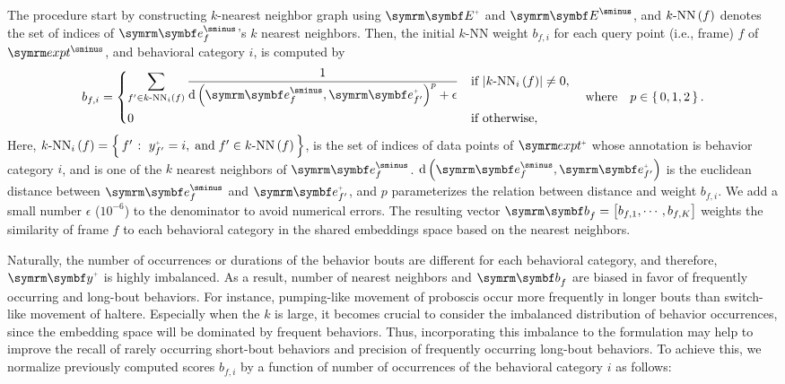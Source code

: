 The procedure start by constructing $k$-nearest neighbor graph using $\Ann{\V{E}}$ and $\Unann{\V{E}}$, and ${k\mathrm{\textnormal{-}NN}} \left( f \right)$ denotes the set of indices of $\Unann{\V{e}}_f$'s $k$ nearest neighbors. Then, the initial $k$-NN weight $b_{f,i}$ for each query point (i.e., frame) $f$ of $\exptUnann$, and behavioral category $i$, is computed by
\begin{equation}
	b_{f,i} = \begin{dcases}
		\sum_{f^\prime \in \NNi{k}{i}{f}}\frac{1}{\dist{\Unann{\V{e}}_f}{\Ann{\V{e}}_{f^\prime}}^p + \epsilon} & \textnormal{if } \card{\NNi{k}{i}{f}} \neq 0, \\
		0                                                                                                      & \textnormal{if otherwise},
	\end{dcases} \qbwhere p \in \set{0,1,2}.
\end{equation}
Here, $\NNi{k}{i}{f}=\Set{f^\prime}{\Ann{y}_{f^\prime}=i, \dband f^\prime \in \NN{k}{f}}$, is the set of indices of data points of $\exptAnn$ whose annotation is behavior category $i$, and is one of the $k$ nearest neighbors of $\Unann{\V{e}}_f$.
$\dist{\Unann{\V{e}}_f}{\Ann{\V{e}}_{f^\prime}}$ is the euclidean distance between $\Unann{\V{e}}_f$ and $\Ann{\V{e}}_{f^\prime}$, and $p$ parameterizes the relation between distance and weight $b_{f,i}$.
We add a small number $\epsilon$ ($10^{{-}6}$) to the denominator to avoid numerical errors.
The resulting vector $\V{b}_f = \qmatrix{b_{f,1}, \cdots, b_{f,K}}$ weights the similarity of frame $f$ to each behavioral category in the shared embeddings space based on the nearest neighbors.

Naturally, the number of occurrences or durations of the behavior bouts are different for each behavioral category, and therefore, $\Ann{\V{y}}$ is highly imbalanced.
As a result, number of nearest neighbors and $\V{b}_f$ are biased in favor of frequently occurring and long-bout behaviors.
For instance, pumping-like movement of proboscis occur more frequently in longer bouts than switch-like movement of haltere.
Especially when the $k$ is large, it becomes crucial to consider the imbalanced distribution of behavior occurrences, since the embedding space will be dominated by frequent behaviors.
Thus, incorporating this imbalance to the formulation may help to improve the recall of rarely occurring short-bout behaviors and precision of frequently occurring long-bout behaviors.
To achieve this, we normalize previously computed scores $b_{f,i}$ by a function of number of occurrences of the behavioral category $i$ as follows:

